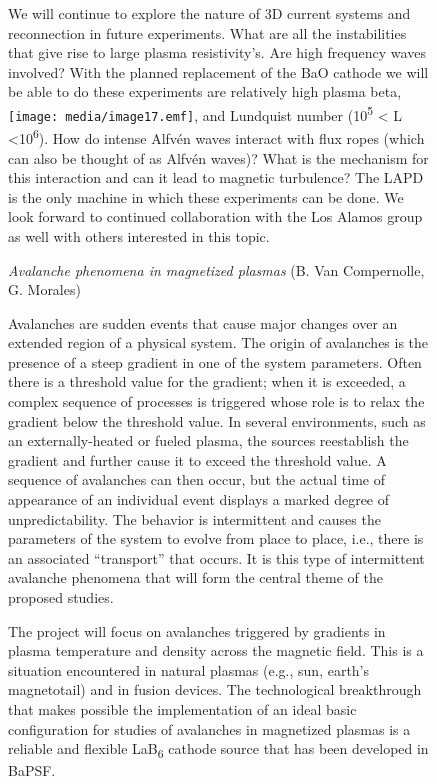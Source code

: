 \documentclass[11pt]{article}
\begin{document}
\begin{description}
\begin{figure}[!htbp]
We will continue to explore the nature of 3D current systems and
reconnection in future experiments. What are all the instabilities that
give rise to large plasma resistivity's. Are high frequency waves
involved? With the planned replacement of the BaO cathode we will be
able to do these experiments are relatively high plasma beta,
\texttt{[image: media/image17.emf]}, and Lundquist number
(10\textsuperscript{5} \textless{} L \textless{}10\textsuperscript{6}).
How do intense Alfvén waves interact with flux ropes (which can also be
thought of as Alfvén waves)? What is the mechanism for this interaction
and can it lead to magnetic turbulence? The LAPD is the only machine in
which these experiments can be done. We look forward to continued
collaboration with the Los Alamos group as well with others interested
in this topic.

\emph{Avalanche phenomena in magnetized plasmas} (B. Van Compernolle, G.
Morales)

Avalanches are sudden events that cause major changes over an extended
region of a physical system. The origin of avalanches is the presence of
a steep gradient in one of the system parameters. Often there is a
threshold value for the gradient; when it is exceeded, a complex
sequence of processes is triggered whose role is to relax the gradient
below the threshold value. In several environments, such as an
externally-heated or fueled plasma, the sources reestablish the gradient
and further cause it to exceed the threshold value. A sequence of
avalanches can then occur, but the actual time of appearance of an
individual event displays a marked degree of unpredictability. The
behavior is intermittent and causes the parameters of the system to
evolve from place to place, i.e., there is an associated ``transport''
that occurs. It is this type of intermittent avalanche phenomena that
will form the central theme of the proposed studies.

The project will focus on avalanches triggered by gradients in plasma
temperature and density across the magnetic field. This is a situation
encountered in natural plasmas (e.g., sun, earth's magnetotail) and in
fusion devices. The technological breakthrough that makes possible the
implementation of an ideal basic configuration for studies of avalanches
in magnetized plasmas is a reliable and flexible LaB\textsubscript{6}
cathode source that has been developed in BaPSF.


\end{figure}
\end{description}
\end{document}
